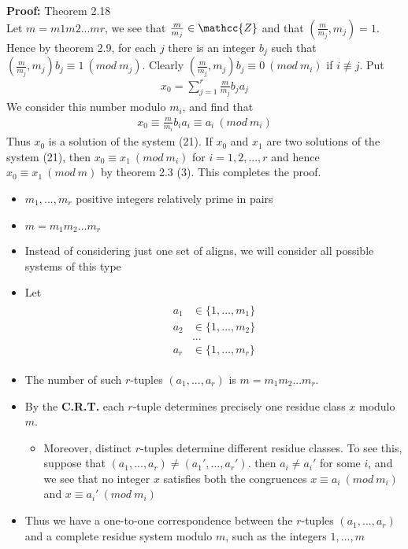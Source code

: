 \documentclass[a4paper]{article}
\begin{document}
\textbf{Proof:} Theorem 2.18\\
Let $m = m1m2...mr$, we see that $\frac{m}{m_j}\in\mathcc{Z}$ and that $(\frac{m}{m_j},m_j)=1$. Hence by theorem 2.9, for each $j$ there is an integer $b_j$ such that $(\frac{m}{m_j},m_j)b_j \equiv 1 \ (mod\ m_j)$. Clearly $(\frac{m}{m_j},m_j)b_j \equiv 0 \ (mod\ m_i)$ if $i\not\equiv j$. Put
\begin{align*}
    x_0 = \sum_{j=1}^r\frac{m}{m_j}b_ja_j
\end{align*}
We consider this number modulo $m_i$, and find that
\begin{align*}
    x_0 \equiv \frac{m}{m_i}b_ia_i \equiv a_i \ (mod\ m_i)
\end{align*}
Thus $x_0$ is a solution of the system (21).
If $x_0$ and $x_1$ are two solutions of the system (21), then $x_0 \equiv x_1 \ (mod\ m_i)$ for $i=1,2,...,r$ and hence $x_0 \equiv x_1 \ (mod\ m)$ by theorem 2.3 (3). This completes the proof.


\begin{itemize}
    \item $m_1,...,m_r$ positive integers relatively prime in pairs
    \item $m=m_1m_2...m_r$
    \item Instead of considering just one set of aligns, we will consider all possible systems of this type
    \item Let
    \begin{align}
        \begin{split}
            a_1&\in\{1,...,m_1\}\\
            a_2&\in\{1,...,m_2\}\\
            &...\\
            a_r&\in\{1,...,m_r\}
        \end{split}
    \end{align}
    \item The number of such $r$-tuples $(a_1,...,a_r)$ is $m=m_1m_2...m_r$.
    \item By the \textbf{C.R.T.} each $r$-tuple determines precisely one residue class $x$ modulo $m$.
    \begin{itemize}
        \item Moreover, distinct $r$-tuples determine different residue classes. To see this, suppose that $(a_1,...,a_r)\neq(a_1',...,a_r')$. then $a_i\neq a_i'$ for some $i$, and we see that no integer $x$ satisfies both the congruences $x\equiv a_i\ (mod\ m_i)$ and $x\equiv a_i'\ (mod\ m_i)$
    \end{itemize}
    \item Thus we have a one-to-one correspondence between the $r$-tuples $(a_1,...,a_r)$ and a complete residue system modulo $m$, such as the integers $1,...,m$
\end{itemize}
\end{document}
